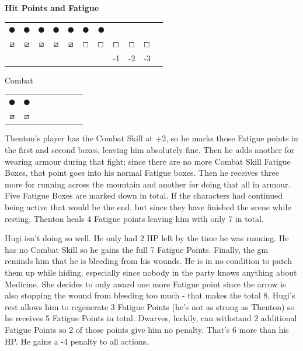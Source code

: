 \documentclass[titlepage,a4paper,openany]{book}
\begin{document}
\begin{multicols}{2}
{\begin{exampletext}
\vspace{1em}

\textbf{Hit Points and Fatigue}

	\begin{tabularx}{\linewidth}{ccccccccccc}

		$\CIRCLE$ & $\CIRCLE$ & $\CIRCLE$ & $\CIRCLE$ & $\CIRCLE$ & $\CIRCLE$ & $\CIRCLE$ & \Circle & \Circle & \Circle \\ 

		$\boxslash$ & $\boxslash$ & $\boxslash$ & $\boxslash$ & $\boxslash$ & $\boxempty$ & $\boxempty$ & $\boxempty$ & $\boxempty$ & $\boxempty$ \\ 

		&&&&&&& -1 & -2 & -3 \\

	\end{tabularx}

	Combat 

	\begin{tabularx}{.4\textwidth}{cccccccc}


		$\CIRCLE$ & $\CIRCLE$ \\ 

		$\boxslash$ & $\boxslash$ \\ 

	\end{tabularx}

\vspace{1em}

	Thenton's player has the Combat Skill at +2, so he marks those Fatigue points in the first and second boxes, leaving him absolutely fine. Then he adds another for wearing armour during that fight; since there are no more Combat Skill Fatigue Boxes, that point goes into his normal Fatigue boxes. Then he receives three more for running across the mountain and another for doing that all in armour. Five Fatigue Boxes are marked down in total. If the characters had continued being active that would be the end, but since they have finished the scene while resting, Thenton heals 4 Fatigue points leaving him with only 7 in total.

	Hugi isn't doing so well. He only had 2 HP left by the time he was running. He has no Combat Skill so he gains the full 7 Fatigue Points. Finally, the \gls{gm} reminds him that he is bleeding from his wounds. He is in no condition to patch them up while hiding, especially since nobody in the party knows anything about Medicine. She decides to only award one more Fatigue point since the arrow is also stopping the wound from bleeding too much - that makes the total 8. Hugi's rest allows him to regenerate 3 Fatigue Points (he's not as strong as Thenton) so he receives 5 Fatigue Points in total. Dwarves, luckily, can withstand 2 additional Fatigue Points so 2 of those points give him no penalty. That's 6 more than his HP. He gains a -4 penalty to all actions.


\end{exampletext}}
\end{multicols}
\end{document}
